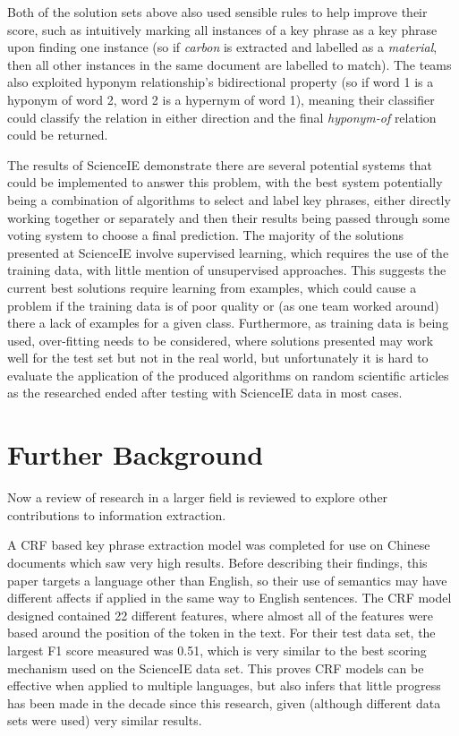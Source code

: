Both of the solution sets above also used sensible rules to help improve their score, such as intuitively marking all instances of a key phrase as a key phrase upon finding one instance (so if \textit{carbon} is extracted and labelled as a \textit{material}, then all other instances in the same document are labelled to match). The teams also exploited hyponym relationship’s bidirectional property (so if word 1 is a hyponym of word 2, word 2 is a hypernym of word 1), meaning their classifier could classify the relation in either direction and the final \textit{hyponym-of} relation could be returned.

The results of ScienceIE demonstrate there are several potential systems that could be implemented to answer this problem, with the best system potentially being a combination of algorithms to select and label key phrases, either directly working together or separately and then their results being passed through some voting system to choose a final prediction. The majority of the solutions presented at ScienceIE involve supervised learning, which requires the use of the training data, with little mention of unsupervised approaches. This suggests the current best solutions require learning from examples, which could cause a problem if the training data is of poor quality or (as one team worked around) there a lack of examples for a given class. Furthermore, as training data is being used, over-fitting needs to be considered, where solutions presented may work well for the test set but not in the real world, but unfortunately it is hard to evaluate the application of the produced algorithms on random scientific articles as the researched ended after testing with ScienceIE data in most cases.

\section{Further Background}
Now a review of research in a larger field is reviewed to explore other contributions to information extraction.

A CRF based key phrase extraction model was completed for use on Chinese documents which saw very high results. Before describing their findings, this paper targets a language other than English, so their use of semantics may have different affects if applied in the same way to English sentences. The CRF model designed contained 22 different features, where almost all of the features were based around the position of the token in the text. For their test data set, the largest F1 score measured was 0.51, which is very similar to the best scoring mechanism used on the ScienceIE data set. This proves CRF models can be effective when applied to multiple languages, but also infers that little progress has been made in the decade since this research, given (although different data sets were used) very similar results. 

